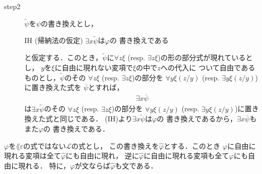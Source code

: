 \begin{metaprf}
\begin{description}
\begin{description}
					\item[step2]
						$\widetilde{\psi}$を$\psi$の書き換えとし，
						\begin{itembox}[l]{IH (帰納法の仮定)}
							$\exists x \widetilde{\psi}$は$\varphi$の
							書き換えである
						\end{itembox}
						と仮定する．このとき，$\widetilde{\psi}$に$\forall z \xi$ 
						(resp. $\exists z \xi$)の形の部分式が現れているとし，
						$y$を$\xi$に自由に現れない変項で$\xi$の中で$z$への代入に
						ついて自由であるものとし，$\widetilde{\psi}$のその
						$\forall z \xi$ (resp. $\exists z \xi$)の部分を
						$\forall y \xi(z/y)$
						(resp. $\exists y \xi(z/y)$)に置き換えた式を
						$\overline{\psi}$とすれば，
						\begin{align}
							\exists x \overline{\psi}
						\end{align}
						は$\exists x \widetilde{\psi}$のその
						$\forall z \xi$ (resp. $\exists z \xi$)の部分を
						$\forall y \xi(z/y)$
						(resp. $\exists y \xi(z/y)$)に置き換えた式と同じである．
						(IH)より$\exists x \widetilde{\psi}$は$\varphi$の
						書き換えであるから，$\exists x \overline{\psi}$もまた$\varphi$の
						書き換えである．
						\QED
				\end{description}
		\end{description}
	\end{metaprf}
	
	\begin{screen}
		\begin{metathm}[書き換えによって自由な変項は増減しない]
		\label{metathm:variables_unchanged_after_rewriting}
			$\varphi$を$\lang{\varepsilon}$の式ではない$\mathcal{L}$の式とし，
			この書き換えを$\widehat{\varphi}$とする．このとき
			$\varphi$に自由に現れる変項は全て$\widehat{\varphi}$にも自由に現れ，
			逆に$\widehat{\varphi}$に自由に現れる変項も全て$\varphi$にも自由に現れる．
			特に，$\varphi$が文ならば$\widehat{\varphi}$も文である．
		\end{metathm}
	\end{screen}
	
